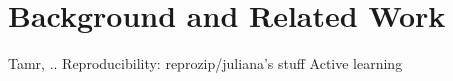 \section{Background and Related Work}
Tamr, ..
Reproducibility: reprozip/juliana’s stuff
Active learning
